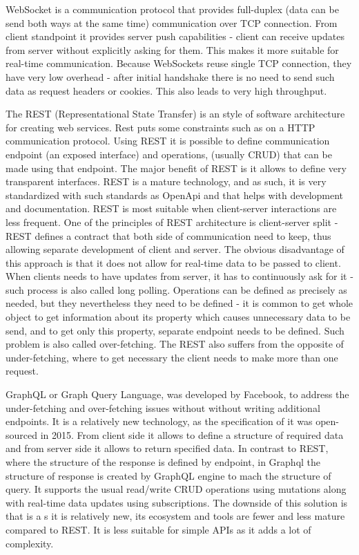 WebSocket is a communication protocol that provides full-duplex (data can be send both ways at the same time) communication over TCP connection. From client standpoint it provides server push capabilities - client can receive updates from server without explicitly asking for them. This makes it more suitable for real-time communication. Because WebSockets reuse single TCP connection, they have very low overhead - after initial handshake there is no need to send such data as request headers or cookies. This also leads to very high throughput. 

The REST (Representational State Transfer) is an style of software architecture for creating web services. Rest puts some constraints such as  on a HTTP communication protocol. Using REST it is possible to define communication endpoint (an exposed interface) and operations, (usually CRUD) that can be made using that endpoint. The major benefit of REST is it allows to define very transparent interfaces. REST is a mature technology, and as such, it is very standardized with such standards as OpenApi and that helps with development and documentation. REST is most suitable when client-server interactions are less frequent. One of the principles of REST architecture is client-server split - REST defines a contract that both side of communication need to keep, thus allowing separate development of client and server. The obvious disadvantage of this approach is that it does not allow for real-time data to be passed to client. When clients needs to have updates from server, it has to continuously ask for it - such process is also called long polling. Operations can be defined as precisely as needed, but they nevertheless they need to be defined - it is common to get whole object to get information about its property which causes unnecessary data to be send, and to get only this property, separate endpoint needs to be defined. Such problem is also called over-fetching. The REST also suffers from the opposite of under-fetching, where to get necessary the client needs to make more than one request.

GraphQL or Graph Query Language, was developed by Facebook, to address the under-fetching and over-fetching issues without without writing additional endpoints.  It is a relatively new technology, as the specification of it was open-sourced in 2015. From client side it allows to define a structure of required data and from server side it allows to return specified data. In contrast to REST, where the structure of the response is defined by endpoint, in Graphql the structure of response is created by GraphQL engine to mach the structure of query. It supports the usual read/write CRUD operations using mutations along with real-time data updates using subscriptions. The downside of this solution is that is a s it is relatively new, its ecosystem and tools are fewer and less mature compared to REST. It is less suitable for simple APIs as it adds a lot of complexity.

